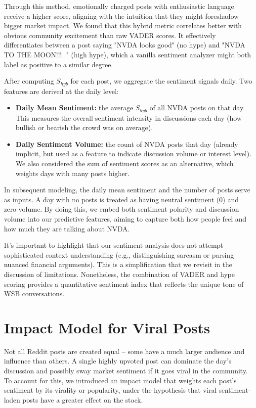 \documentclass[conference]{IEEEtran}
\begin{document}
Through this method, emotionally charged posts with enthusiastic language receive a higher score, aligning with the intuition that they might foreshadow bigger market impact. We found that this hybrid metric correlates better with obvious community excitement than raw VADER scores. It effectively differentiates between a post saying "NVDA looks good" (no hype) and "NVDA TO THE MOON!!! {\emojifont 🚀}" (high hype), which a vanilla sentiment analyzer might both label as positive to a similar degree.

After computing $S_{hyb}$ for each post, we aggregate the sentiment signals daily. Two features are derived at the daily level:
\begin{itemize}
	\item \textbf{Daily Mean Sentiment:} the average $S_{hyb}$ of all NVDA posts on that day. This measures the overall sentiment intensity in discussions each day (how bullish or bearish the crowd was on average).
	\item \textbf{Daily Sentiment Volume:} the count of NVDA posts that day (already implicit, but used as a feature to indicate discussion volume or interest level). We also considered the sum of sentiment scores as an alternative, which weights days with many posts higher.
\end{itemize}

In subsequent modeling, the daily mean sentiment and the number of posts serve as inputs. A day with no posts is treated as having neutral sentiment (0) and zero volume. By doing this, we embed both sentiment polarity and discussion volume into our predictive features, aiming to capture both how people feel and how much they are talking about NVDA.

It’s important to highlight that our sentiment analysis does not attempt sophisticated context understanding (e.g., distinguishing sarcasm or parsing nuanced financial arguments). This is a simplification that we revisit in the discussion of limitations. Nonetheless, the combination of VADER and hype scoring provides a quantitative sentiment index that reflects the unique tone of WSB conversations.

\section{Impact Model for Viral Posts}
Not all Reddit posts are created equal – some have a much larger audience and influence than others. A single highly upvoted post can dominate the day’s discussion and possibly sway market sentiment if it goes viral in the community. To account for this, we introduced an impact model that weights each post’s sentiment by its virality or popularity, under the hypothesis that viral sentiment-laden posts have a greater effect on the stock.
\end{document}
